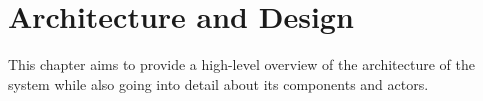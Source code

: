 \chapter{Architecture and Design}
This chapter aims to provide a high-level overview of the architecture of the system while also going into detail about its components and actors.


